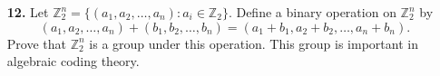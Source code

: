 \documentclass[12pt,reqno]{amsart}
\begin{document}
\begin{enumerate}
\medskip

\item[{\bf 12.}]
Let ${\mathbb Z}_2^n = \{ (a_1, a_2, \ldots, a_n) : a_i \in {\mathbb Z}_2
\}$. Define a binary operation on ${\mathbb Z}_2^n$ by
\[
(a_1, a_2, \ldots, a_n)
+
(b_1, b_2, \ldots, b_n)
=
(a_1+b_1, a_2+b_2, \ldots, a_n+b_n).
\]
Prove that ${\mathbb Z}_2^n$ is a group under this operation. This group
is important in algebraic coding theory. 
 

\end{enumerate}
\end{document}
